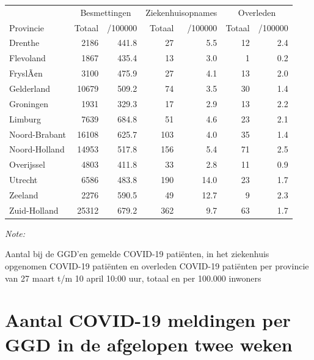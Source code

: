 \documentclass[
  english,
  man,floatsintext]{apa6}
\begin{document}
\begin{table}
\centering
\begin{threeparttable}
\begin{tabular}{lrrrrrr}
\toprule
\multicolumn{1}{c}{ } & \multicolumn{2}{c}{Besmettingen} & \multicolumn{2}{c}{Ziekenhuisopnames} & \multicolumn{2}{c}{Overleden} \\
\cmidrule(l{3pt}r{3pt}){2-3} \cmidrule(l{3pt}r{3pt}){4-5} \cmidrule(l{3pt}r{3pt}){6-7}
Provincie & Totaal & /100000 & Totaal & /100000 & Totaal & /100000\\
\midrule
Drenthe & 2186 & 441.8 & 27 & 5.5 & 12 & 2.4\\
Flevoland & 1867 & 435.4 & 13 & 3.0 & 1 & 0.2\\
FryslÃ¢n & 3100 & 475.9 & 27 & 4.1 & 13 & 2.0\\
Gelderland & 10679 & 509.2 & 74 & 3.5 & 30 & 1.4\\
Groningen & 1931 & 329.3 & 17 & 2.9 & 13 & 2.2\\
Limburg & 7639 & 684.8 & 51 & 4.6 & 23 & 2.1\\
Noord-Brabant & 16108 & 625.7 & 103 & 4.0 & 35 & 1.4\\
Noord-Holland & 14953 & 517.8 & 156 & 5.4 & 71 & 2.5\\
Overijssel & 4803 & 411.8 & 33 & 2.8 & 11 & 0.9\\
Utrecht & 6586 & 483.8 & 190 & 14.0 & 23 & 1.7\\
Zeeland & 2276 & 590.5 & 49 & 12.7 & 9 & 2.3\\
Zuid-Holland & 25312 & 679.2 & 362 & 9.7 & 63 & 1.7\\
\bottomrule
\end{tabular}
\begin{tablenotes}
\item \textit{Note: } 
\item Aantal bij de GGD’en gemelde COVID-19 patiënten, in het ziekenhuis opgenomen COVID-19 patiënten en overleden COVID-19 patiënten per provincie van 27 maart t/m 10 april 10:00 uur, totaal en per 100.000 inwoners
\end{tablenotes}
\end{threeparttable}
\end{table}

\newpage

\hypertarget{aantal-covid-19-meldingen-per-ggd-in-de-afgelopen-twee-weken}{%
\section{Aantal COVID-19 meldingen per GGD in de afgelopen twee weken}\label{aantal-covid-19-meldingen-per-ggd-in-de-afgelopen-twee-weken}}
\end{document}
